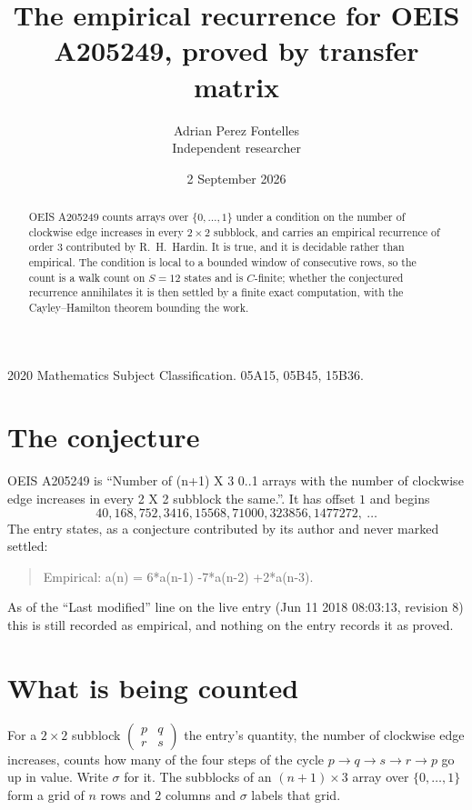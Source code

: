 \documentclass[11pt,a4paper]{article}
\title{The empirical recurrence for OEIS A205249, proved by transfer matrix}
\author{Adrian Perez Fontelles\\ \small Independent researcher}
\date{2 September 2026}
\theoremstyle{plain}
\theoremstyle{definition}
\begin{document}
\maketitle

\begin{abstract}
OEIS A205249 counts arrays over $\{0,\dots,1\}$ under a condition on the number of clockwise edge increases
in every $2\times2$ subblock, and carries an empirical recurrence of order $3$ contributed by
R.~H.~Hardin. It is true, and it is decidable rather than empirical. The condition is local to
a bounded window of consecutive rows, so the count is a walk count on $S=12$ states and is
$C$-finite; whether the conjectured recurrence annihilates it is then settled by a finite exact
computation, with the Cayley--Hamilton theorem bounding the work.
\end{abstract}

\noindent\small 2020 Mathematics Subject Classification. 05A15, 05B45, 15B36.\normalsize

\section{The conjecture}

OEIS A205249 is ``Number of (n+1) X 3 0..1 arrays with the number of clockwise edge increases in every 2 X 2 subblock the same.''. It has offset $1$ and begins
\[
40, 168, 752, 3416, 15568, 71000, 323856, 1477272,\ \dots
\]
The entry states, as a conjecture contributed by its author and never marked settled:
\begin{quote}
Empirical: a(n) = 6*a(n-1) -7*a(n-2) +2*a(n-3).
\end{quote}
As of the ``Last modified'' line on the live entry (Jun 11 2018 08:03:13, revision 8) this is still
recorded as empirical, and nothing on the entry records it as proved.

\section{What is being counted}

For a $2\times2$ subblock $\begin{pmatrix}p&q\\r&s\end{pmatrix}$ the
entry's quantity, the number of clockwise edge increases, counts how many of the four steps of the cycle $p\to q\to s\to r\to p$ go up in value. Write $\sigma$ for it. The subblocks of an
$(n+1)\times3$ array over $\{0,\dots,1\}$ form a grid of $n$ rows and $2$
columns and $\sigma$ labels that grid.
\end{document}
